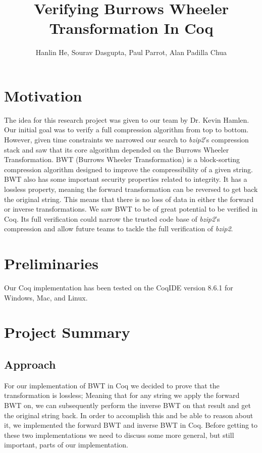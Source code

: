 \documentclass[11pt,letterpaper,titlepage]{article}
\title{Verifying Burrows Wheeler Transformation In Coq}
\author{Hanlin He, Sourav Dasgupta, Paul Parrot, Alan Padilla Chua}
\begin{document}
\maketitle

\section{Motivation}

The idea for this research project was given to our team by Dr. Kevin Hamlen.
Our initial goal was to verify a full compression algorithm from top to bottom.
However, given time constraints we narrowed our search to \emph{bzip2}'s
compression stack and saw that its core algorithm depended on the Burrows
Wheeler Transformation\cite{bzip2}. BWT (Burrows Wheeler Transformation) is a
block-sorting compression algorithm designed to improve the compressibility of
a given string. BWT also has some important security properties related to
integrity. It has a lossless property, meaning the forward transformation can
be reversed to get back the original string. This means that there is no loss
of data in either the forward or inverse transformations. We saw BWT to be of
great potential to be verified in Coq. Its full verification could narrow the
trusted code base of \emph{bzip2}'s compression and allow future teams to
tackle the full verification of \emph{bzip2}.

\section{Preliminaries}

Our Coq implementation has been tested on the CoqIDE version 8.6.1 for Windows,
Mac, and Linux.

\section{Project Summary}

\subsection{Approach}

For our implementation of BWT in Coq we decided to prove that the
transformation is lossless; Meaning that for any string we apply the forward
BWT on, we can subsequently perform the inverse BWT on that result and get the
original string back. In order to accomplish this and be able to reason about
it, we implemented the forward BWT and inverse BWT in Coq. Before getting to
these two implementations we need to discuss some more general, but still
important, parts of our implementation.
\end{document}
